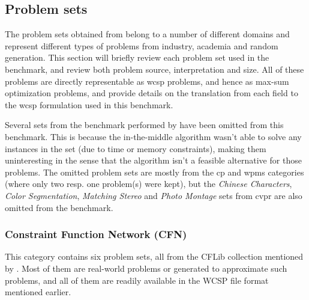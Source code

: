 \subsection{Problem sets}
The problem sets obtained from \textcite{deGivry14} belong to a number of different domains and represent different types of problems from industry, academia and random generation.
This section will briefly review each problem set used in the benchmark, and review both problem source, interpretation and size.
All of these problems are directly representable as \gls{wcsp} problems, and hence as max-sum optimization problems, and \textcite{deGivry14} provide details on the translation from each field to the \gls{wcsp} formulation used in this benchmark.

Several sets from the benchmark performed by \textcite{deGivry14} have been omitted from this benchmark.
This is because the in-the-middle algorithm wasn't able to solve any instances in the set (due to time or memory constraints), making them uninteresting in the sense that the algorithm isn't a feasible alternative for those problems. 
The omitted problem sets are mostly from the \gls{cp} and \gls{wpms} categories (where only two resp. one problem(s) were kept), but the \emph{Chinese Characters}, \emph{Color Segmentation}, \emph{Matching Stereo} and \emph{Photo Montage} sets from \gls{cvpr} are also omitted from the benchmark.

\subsubsection{Constraint Function Network (CFN)}
This category contains six problem sets, all from the CFLib collection mentioned by \textcite[\pno~3]{deGivry14}.
Most of them are real-world problems or generated to approximate such problems, and all of them are readily available in the WCSP file format mentioned earlier.

